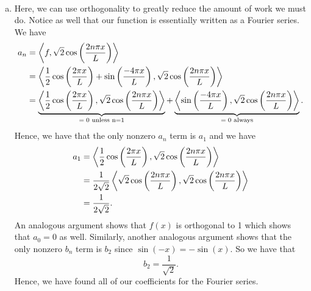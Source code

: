 \documentclass[12pt]{article} %
\begin{document}
\begin{solution}~
	\begin{enumerate}[(a)]
		\item Here, we can use orthogonality to greatly reduce the amount of work we must do.  Notice as well that our function is essentially written as a Fourier series.  We have
		\begin{align*}
		a_n &= \left\langle f, \sqrt{2}\cos\left(\frac{2n\pi x}{L}\right) \right\rangle\\
				&= \left\langle \frac{1}{2}\cos\left(\frac{2\pi x}{L}\right)+\sin\left(\frac{-4\pi x}{L}\right), \sqrt{2}\cos\left(\frac{2n\pi x}{L}\right) \right\rangle\\
				&= \underbrace{\left\langle \frac{1}{2}\cos\left(\frac{2\pi x}{L}\right), \sqrt{2}\cos\left(\frac{2n\pi x}{L}\right) \right\rangle}_{\textrm{$=0$ unless n=1}} +\underbrace{\left\langle \sin\left(\frac{-4\pi x}{L}\right), \sqrt{2}\cos\left(\frac{2n\pi x}{L}\right) \right\rangle}_{\textrm{$=0$ always}}.
		\end{align*}
		Hence, we have that the only nonzero $a_n$ term is $a_1$ and we have
		\begin{align*}
		a_1 &= \left\langle \frac{1}{2}\cos\left(\frac{2\pi x}{L}\right), \sqrt{2}\cos\left(\frac{2n\pi x}{L}\right) \right\rangle\\
		& = \frac{1}{2\sqrt{2}} \left\langle \sqrt{2}\cos\left(\frac{2n\pi x}{L}\right), \sqrt{2}\cos\left(\frac{2n\pi x}{L}\right) \right\rangle\\
		& = \frac{1}{2\sqrt{2}}.
		\end{align*}
		An analogous argument shows that $f(x)$ is orthogonal to 1 which shows that $a_0=0$ as well. Similarly, another analogous argument shows that the only nonzero $b_n$ term is $b_2$ since $\sin(-x)=-\sin(x)$.  So we have that
		\[
		b_2 = \frac{1}{\sqrt{2}}.
		\]
		Hence, we have found all of our coefficients for the Fourier series.
		

\end{enumerate}
\end{solution}
\end{document}
